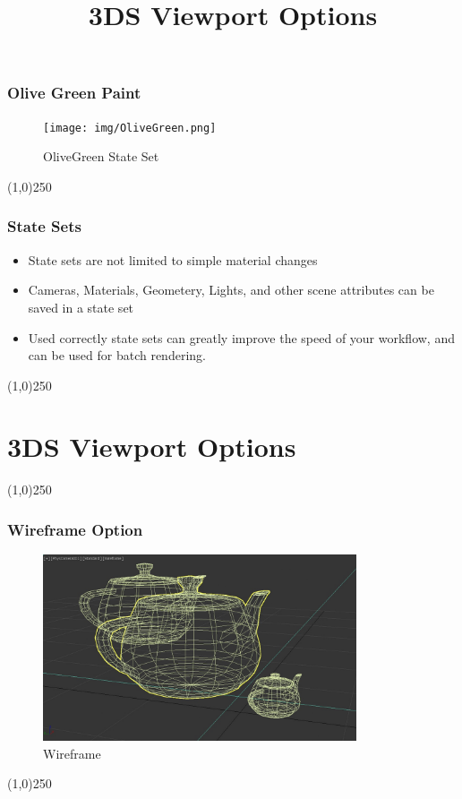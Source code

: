 \begin{frame}
\frametitle{Olive Green Paint}
\begin{figure}
	\centering
		\texttt{[image: img/OliveGreen.png]}
	\caption{OliveGreen State Set}
	\label{fig:OliveGreen}
\end{figure}
\end{frame}
\begin{center}\line(1,0){250}\end{center}


\begin{frame}
\frametitle{State Sets}
\begin{itemize}
	\item State sets are not limited to simple material changes
	\item Cameras, Materials, Geometery, Lights, and other scene attributes can be saved in a state set
	\item Used correctly state sets can greatly improve the speed of your workflow, and can be used for batch rendering.
\end{itemize}
\end{frame}
\begin{center}\line(1,0){250}\end{center}



\section{3DS Viewport Options}
\begin{frame}
\title[3DS Viewport Options]{3DS Viewport Options}
\titlepage
\end{frame}\begin{center}\line(1,0){250}\end{center}


\begin{frame}
\frametitle{Wireframe Option}
\begin{figure}
	\centering
	\includegraphics[height=5.5cm]{img/ViewportOptions/Wireframe.jpg}
	\caption{Wireframe}
	\label{fig:WireframeOption}
\end{figure}
\end{frame}
\begin{center}\line(1,0){250}\end{center}




